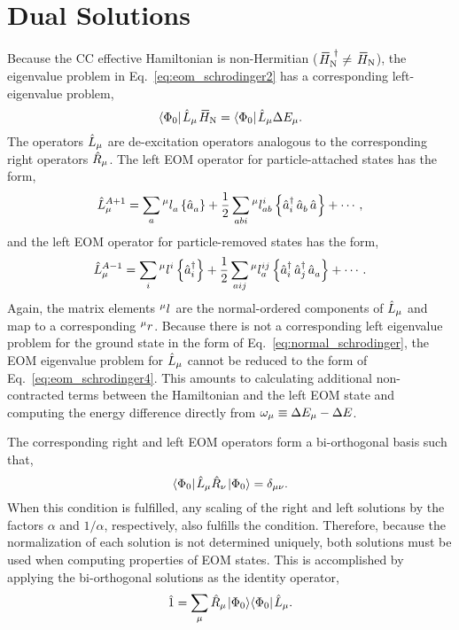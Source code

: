 \documentclass[thesis.tex]{subfiles}
\begin{document}
\section{Dual Solutions} \label{section:eom_dual}

Because the CC effective Hamiltonian is non-Hermitian ($\EHamN^{\dagger} \neq \EHamN$), the eigenvalue problem in Eq.\ \eqref{eq:eom_schrodinger2} has a corresponding left-eigenvalue problem,
\begin{equation} \label{eq:eom_dual1}
  \refbra\Lop_{\mu}\EHamN = \refbra\Lop_{\mu}\Ecorr_{\mu}.
\end{equation}
The operators $\hat{L}\hspace{-0.1pt}_{\mu}$ are de-excitation operators analogous to the corresponding right operators $\hat{R}\hspace{-0.1pt}_{\mu}$.  The left EOM operator for particle-attached states has the form,
\begin{equation}
  \hat{L}\hspace{-0.1pt}^{A+1}_{\mu} = \sum_{a}{}^{\mu}l^{\hspace{0.1pt}}_{a}\left\{\mathop{\hat{a}^{}_{a}}\right\} + \frac{1}{2}\sum_{abi}{}^{\mu}l^{\hspace{0.1pt}i}_{ab}\left\{\mathop{\hat{a}^{\dagger}_{i}}\mathop{\hat{a}^{}_{b}}\mathop{\hat{a}^{}_{}}\right\} + \cdots,
\end{equation}
and the left EOM operator for particle-removed states has the form,
\begin{equation}
  \hat{L}\hspace{-0.1pt}^{A-1}_{\mu} = \sum_{i}{}^{\mu}l^{\hspace{0.1pt}i}_{}\left\{\mathop{\hat{a}^{\dagger}_{i}}\right\} + \frac{1}{2}\sum_{aij}{}^{\mu}l^{\hspace{0.1pt}ij}_{a}\left\{\mathop{\hat{a}^{\dagger}_{i}}\mathop{\hat{a}^{\dagger}_{j}}\mathop{\hat{a}^{}_{a}}\right\} + \cdots.
\end{equation}
Again, the matrix elements ${}^{\mu}l^{\hspace{0.1pt}}_{}$ are the normal-ordered components of $\hat{L}\hspace{-0.1pt}_{\mu}$ and map to a corresponding ${}^{\mu}r^{}_{}$.  Because there is not a corresponding left eigenvalue problem for the ground state in the form of Eq.\ \eqref{eq:normal_schrodinger}, the EOM eigenvalue problem for $\hat{L}\hspace{-0.1pt}_{\mu}$ cannot be reduced to the form of Eq.\ \eqref{eq:eom_schrodinger4}.  This amounts to calculating additional non-contracted terms between the Hamiltonian and the left EOM state and computing the energy difference directly from $\omega_{\mu} \equiv \Delta E_{\mu} - \Delta E$.

The corresponding right and left EOM operators form a bi-orthogonal basis such that,
\begin{equation}
  \langle \Phi_{0} |\hspace{1pt}\hat{L}\hspace{-0.1pt}_{\mu}\hat{R}\hspace{-0.1pt}_{\nu}\hspace{1pt}\lvert \Phi_{0} \rangle = \delta_{\mu\nu}.
\end{equation}
When this condition is fulfilled, any scaling of the right and left solutions by the factors $\alpha$ and $1/\alpha$, respectively, also fulfills the condition.  Therefore, because the normalization of each solution is not determined uniquely, both solutions must be used when computing properties of EOM states.  This is accomplished by applying the bi-orthogonal solutions as the identity operator,
\begin{gather}
  \hat{1} = \sum_{\mu} \hat{R}\hspace{-0.1pt}_{\mu}\hspace{1pt}\lvert \Phi_{0} \rangle\langle \Phi_{0} |\hspace{1pt}\hat{L}\hspace{-0.1pt}_{\mu}.
\end{gather}
\end{document}
